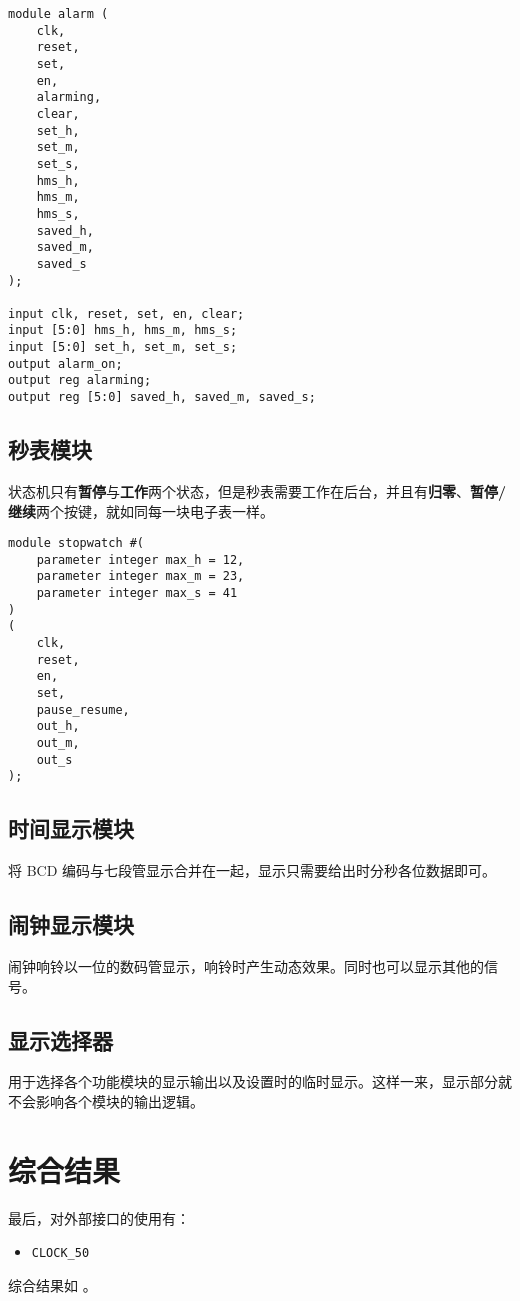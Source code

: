 \documentclass[lang=cn,11pt,a4paper,cite=authoryear]{elegantpaper}
\begin{document}
\begin{lstlisting}[caption={闹钟模块端口定义}]
module alarm (
    clk,
    reset,
    set,
    en,
    alarming,
    clear,
    set_h,
    set_m,
    set_s,
    hms_h,
    hms_m,
    hms_s,
    saved_h, 
    saved_m, 
    saved_s
);

input clk, reset, set, en, clear;
input [5:0] hms_h, hms_m, hms_s;
input [5:0] set_h, set_m, set_s;
output alarm_on;
output reg alarming;
output reg [5:0] saved_h, saved_m, saved_s;
\end{lstlisting}
    
\subsection{秒表模块}

状态机只有\textbf{暂停}与\textbf{工作}两个状态，但是秒表需要工作在后台，并且有\textbf{归零}、\textbf{暂停/继续}两个按键，就如同每一块电子表一样。


\begin{lstlisting}[caption={闹钟模块端口定义}]
module stopwatch #(
    parameter integer max_h = 12,
    parameter integer max_m = 23,
    parameter integer max_s = 41
) 
(
    clk,
    reset,
    en,
    set,
    pause_resume,
    out_h,
    out_m,
    out_s
);
\end{lstlisting}

\subsection{时间显示模块}

将 BCD 编码与七段管显示合并在一起，显示只需要给出时分秒各位数据即可。

\subsection{闹钟显示模块}

闹钟响铃以一位的数码管显示，响铃时产生动态效果。同时也可以显示其他的信号。

\subsection{显示选择器}

用于选择各个功能模块的显示输出以及设置时的临时显示。这样一来，显示部分就不会影响各个模块的输出逻辑。

\section{综合结果}

最后，对外部接口的使用有：  

\begin{itemize}
    \item \texttt{CLOCK_50}
\end{itemize}


综合结果如  。


\end{document}
